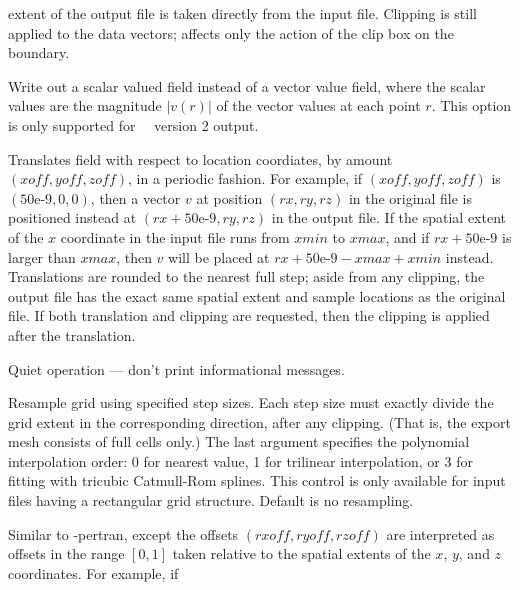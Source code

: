 \begin{description}
  extent of the output file is taken directly from the input file.
  Clipping is still applied to the data vectors;  affects
  only the action of the clip box on the boundary.
\item[\optkey{-mag}]
  Write out a scalar valued field instead of a vector value field, where
  the scalar values are the magnitude $|v(r)|$ of the vector values at
  each point $r$. This option is only supported for \OOMMF\ \OVF\ version
  2 output.
\item[\optkey{-pertran xoff yoff zoff}]
  Translates field with respect to location coordiates, by amount
  $(\mathit{xoff},\mathit{yoff},\mathit{zoff})$, in a periodic
  fashion.  For example, if
  $(\mathit{xoff},\mathit{yoff},\mathit{zoff})$ is $(\mbox{50e-9},0,0)$,
  then a vector $v$ at position
  $(\mathit{rx},\mathit{ry},\mathit{rz})$
  in the original file is positioned instead at
  $(\mathit{rx} + \mbox{50e-9},\mathit{ry},\mathit{rz})$
  in the output file.  If the spatial extent of the
  $x$ coordinate in the input file runs from $\mathit{xmin}$ to
  $\mathit{xmax}$, and if
  $\mathit{rx} +\mbox{50e-9}$ is larger than $\mathit{xmax}$, then $v$
  will be placed at
  $\mathit{rx} + \mbox{50e-9} - \mathit{xmax} + \mathit{xmin}$
  instead.  Translations are rounded to the
  nearest full step; aside from any clipping, the output file has the
  exact same spatial extent and sample locations as the original file.
  If both translation and clipping are requested, then the clipping is
  applied after the translation.
\item[\optkey{-q}]
  Quiet operation --- don't print informational messages.
\item[\optkey{-resample xstep ystep zstep \boa 0\pipe 1\pipe 3\bca}]
  Resample grid using specified step sizes.  Each step size must exactly
  divide the grid extent in the corresponding direction, after any
  clipping.  (That is, the export mesh consists of full cells only.)
  The last argument specifies the polynomial interpolation order: 0 for
  nearest value, 1 for trilinear interpolation, or 3 for fitting with
  tricubic Catmull-Rom splines.  This control is only available for
  input files having a rectangular grid structure.  Default is no
  resampling.
\item[\optkey{-rpertran rxoff ryoff rzoff}]
  Similar to -pertran, except the offsets
  $(\mathit{rxoff},\mathit{ryoff},\mathit{rzoff})$ are
  interpreted as offsets in the range $[0,1]$ taken relative to the
  spatial extents of the $x$, $y$, and $z$ coordinates.  For example, if

\end{description}
